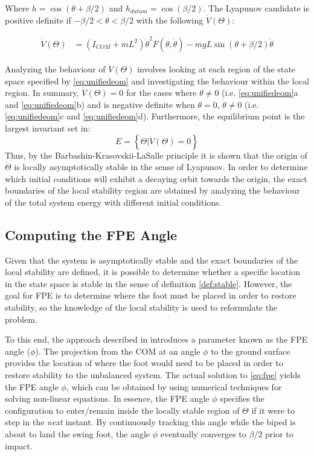 Where $h =\cos (\theta+\beta/2) $ and $h_{datum} = \cos (\beta/2)$. The Lyapunov candidate is positive definite if $-\beta/2 < \theta < \beta/2$ with the following $\dot{V}(\Theta)$: 

\begin{equation}
	\begin{aligned}
			\dot{V}(\Theta) &= ({I_{COM}} + m{L^2}){\dot \theta ^2}F(\theta ,\dot \theta ) - mgL\sin (\theta  + \beta /2)\dot \theta
	\end{aligned}
\end{equation}

Analyzing the behaviour of $\dot{V}(\Theta)$ involves looking at each region of the state space specified by \eqref{eq:unifiedeom} and investigating the behaviour within the local region. In summary, $\dot{V}(\Theta) = 0$ for the cases where $\theta \not= 0$  (i.e. \ref{eq:unifiedeom}a and \ref{eq:unifiedeom}b) and is negative definite when $\theta = 0$, $\dot{\theta} \not= 0$ (i.e. \ref{eq:unifiedeom}c and \ref{eq:unifiedeom}d). Furthermore, the equilibrium point is the largest invariant set in: 
\[E = \left\{ {\Theta |\dot V(\Theta ) = 0} \right\}\]
Thus, by the Barbashin-Krasovskii-LaSalle principle it is shown that the origin of $\dot{\Theta}$ is locally asymptotically stable in the sense of Lyapunov. In order to determine which initial conditions will exhibit a decaying orbit towards the origin, the exact boundaries of the local stability region are obtained by analyzing the behaviour of the total system energy with different initial conditions. 

\subsection{Computing the FPE Angle} %
\label{sub:computing_the_fpe_angle}

Given that the system is asymptotically stable and the exact boundaries of the local stability are defined, it is possible to determine whether a specific location in the state space is stable in the sense of definition \ref{def:stable}. However, the goal for FPE is to determine where the foot must be placed in order to restore stability, so the knowledge of the local stability is used to reformulate the problem. 

To this end, the approach described in \cite{Wight:2008vt} introduces a parameter known as the FPE angle ($\phi$). The projection from the COM at an angle $\phi$ to the ground surface provides the location of where the foot would need to be placed in order to restore stability to the unbalanced system. The actual solution to \eqref{eq:fpe} yields the FPE angle $\phi$, which can be obtained by using numerical techniques for solving non-linear equations. In essence, the FPE angle $\phi$ specifies the configuration to enter/remain inside the locally stable region of $\dot{\Theta}$ if it were to step in the \textit{next} instant. By continuously tracking this angle while the biped is about to land the swing foot, the angle $\phi$ eventually converges to $\beta/2$ prior to impact.

